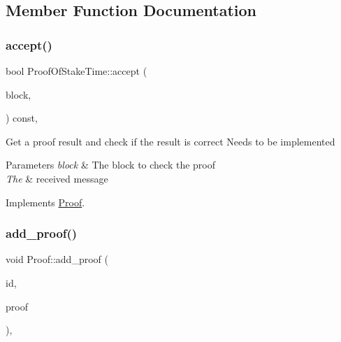 \subsection{Member Function Documentation}
\mbox{\label{classProofOfStakeTime_ae05431416e9157fb8af8247b8e756794}} 
\subsubsection{\texorpdfstring{accept()}{accept()}}
{\footnotesize\ttfamily bool Proof\+Of\+Stake\+Time\+::accept (\begin{DoxyParamCaption}\item[{\mbox{\hyperlink{classBlock}{Block}} $\ast$}]{block,  }\item[{\mbox{\hyperlink{classMessage}{Message}} $\ast$}]{ }\end{DoxyParamCaption}) const\hspace{0.3cm}{\ttfamily [override]}, {\ttfamily [virtual]}}

Get a proof result and check if the result is correct Needs to be implemented


\begin{DoxyParams}{Parameters}
{\em block} & The block to check the proof \\
\hline
{\em The} & received message \\
\hline
\end{DoxyParams}


Implements \mbox{\hyperlink{classProof_a358b3883eb33b8ecc93f74cb6313679a}{Proof}}.

\mbox{\label{classProof_a71874539fdbcc93c15594b889c95225b}} 
\subsubsection{\texorpdfstring{add\+\_\+proof()}{add\_proof()}}
{\footnotesize\ttfamily void Proof\+::add\+\_\+proof (\begin{DoxyParamCaption}\item[{int}]{id,  }\item[{std\+::function$<$ \mbox{\hyperlink{classProof}{Proof}} $\ast$()$>$}]{proof }\end{DoxyParamCaption})\hspace{0.3cm}{\ttfamily [static]}, {\ttfamily [inherited]}}

